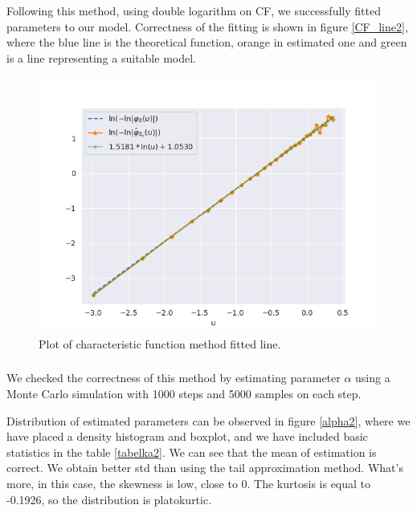 \documentclass{article}
\begin{document}
        Following this method, using double logarithm on CF, we successfully fitted parameters to our model. Correctness of the fitting is shown in figure \ref{CF_line2}, where the blue line is the theoretical function, orange in estimated one and green is a line representing a suitable model.		
		\begin{figure}[H] 
			\centering
			\includegraphics[width=1\linewidth]{images/compare_cf.png}
			\caption{Plot of characteristic function method fitted line.}\label{CF_line}
		\end{figure}
		\subsubsection{}
		
		We checked the correctness of this method by estimating parameter $\alpha$ using a Monte Carlo simulation with 1000 steps and 5000 samples on each step.
		
        Distribution of estimated parameters can be observed in figure \ref{alpha2}, where we have placed a density histogram and boxplot, and we have included basic statistics in the table \ref{tabelka2}.
        We can see that the mean of estimation is correct. We obtain better std than using the tail approximation method. What's more, in this case, the skewness is low, close to 0. The kurtosis is equal to -0.1926, so the distribution is platokurtic.
        
\end{document}
